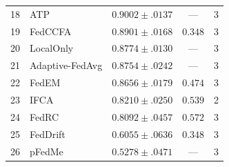 \begin{table}[h]
\begin{tabular}{rlccc}
18 & ATP                 & $0.9002 \pm .0137$ & — & 3 \\
19 & FedCCFA             & $0.8901 \pm .0168$ & $0.348$ & 3 \\
20 & LocalOnly           & $0.8774 \pm .0130$ & — & 3 \\
21 & Adaptive-FedAvg     & $0.8754 \pm .0242$ & — & 3 \\
22 & FedEM               & $0.8656 \pm .0179$ & $0.474$ & 3 \\
23 & IFCA                & $0.8210 \pm .0250$ & $0.539$ & 2 \\
24 & FedRC               & $0.8092 \pm .0457$ & $0.572$ & 3 \\
25 & FedDrift            & $0.6055 \pm .0636$ & $0.348$ & 3 \\
26 & pFedMe              & $0.5278 \pm .0471$ & — & 3 \\
\bottomrule
\end{tabular}
\end{table}

